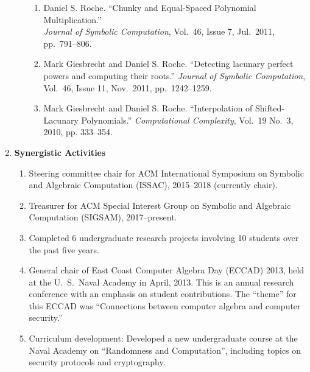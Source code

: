 \documentclass[letterpaper,10pt]{article}
\begin{document}
\begin{enumerate}[label=\textbf{(\alph*)}]
\begin{enumerate}[label=(\roman*)]
\begin{enumerate}[label=\arabic*.]
        \item Daniel S. Roche. 
          ``Chunky and Equal-Spaced Polynomial Multiplication.''\\
          \textit{Journal of Symbolic Computation}, Vol.~46, Issue 7, Jul.~2011,
          pp.~791--806.\\

        \item Mark Giesbrecht and Daniel S. Roche.
          ``Detecting lacunary perfect powers and computing their roots.''
          \textit{Journal of Symbolic Computation}, Vol.~46, Issue 11, Nov.~2011,
          pp.\ 1242--1259.

        \item Mark Giesbrecht and Daniel S. Roche.
          ``Interpolation of Shifted-Lacunary Polynomials.''
          \textit{Computational Complexity}, Vol.~19 No.~3, 2010, pp.
          333--354. \\
      \end{enumerate}

  \end{enumerate}

\item \textbf{Synergistic Activities}
  \begin{enumerate}[label=\arabic*.]
    \item Steering committee chair for ACM International Symposium on
      Symbolic and Algebraic Computation (ISSAC), 2015--2018 (currently
      chair).
    \item Treasurer for ACM Special Interest Group on Symbolic and
      Algebraic Computation (SIGSAM), 2017--present.
    \item Completed 6 undergraduate research projects involving 10 students over
      the past five years.
    \item General chair of East Coast Computer Algebra Day (ECCAD) 2013, 
      held at the U.\ S.\ Naval Academy in April, 2013.
      This is an annual research conference with an emphasis on
      student contributions. The ``theme'' for this ECCAD was
      ``Connections between computer algebra and computer security.'' 
    \item Curriculum development: Developed a new undergraduate course at the
      Naval Academy on ``Randomness and Computation'', including topics
      on security protocols and cryptography.
  \end{enumerate}

\end{enumerate}
\end{document}
